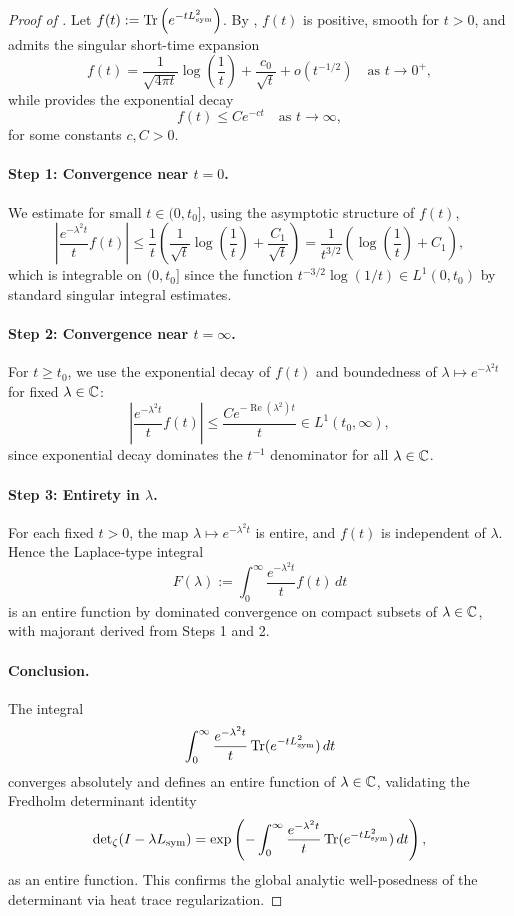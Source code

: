 \begin{proof}[Proof of ]
Let \( f(t) := \operatorname{Tr}\left(e^{-t L_{\mathrm{sym}}^2}\right) \). By , \( f(t) \) is positive, smooth for \( t > 0 \), and admits the singular short-time expansion
\[
f(t) = \frac{1}{\sqrt{4\pi t}} \log\left( \frac{1}{t} \right) + \frac{c_0}{\sqrt{t}} + o(t^{-1/2}) \quad \text{as } t \to 0^+,
\]
while  provides the exponential decay
\[
f(t) \leq C e^{-c t} \quad \text{as } t \to \infty,
\]
for some constants \( c, C > 0 \).

\paragraph{Step 1: Convergence near \( t = 0 \).}
We estimate for small \( t \in (0, t_0] \), using the asymptotic structure of \( f(t) \),
\[
\left| \frac{e^{-\lambda^2 t}}{t} f(t) \right|
\leq \frac{1}{t} \left( \frac{1}{\sqrt{t}} \log\left( \frac{1}{t} \right) + \frac{C_1}{\sqrt{t}} \right)
= \frac{1}{t^{3/2}} \left( \log\left( \frac{1}{t} \right) + C_1 \right),
\]
which is integrable on \( (0, t_0] \) since the function \( t^{-3/2} \log(1/t) \in L^1(0, t_0) \) by standard singular integral estimates.

\paragraph{Step 2: Convergence near \( t = \infty \).}
For \( t \geq t_0 \), we use the exponential decay of \( f(t) \) and boundedness of \( \lambda \mapsto e^{-\lambda^2 t} \) for fixed \( \lambda \in \mathbb{C} \):
\[
\left| \frac{e^{-\lambda^2 t}}{t} f(t) \right| \leq \frac{C e^{-\operatorname{Re}(\lambda^2) t}}{t} \in L^1(t_0, \infty),
\]
since exponential decay dominates the \( t^{-1} \) denominator for all \( \lambda \in \mathbb{C} \).

\paragraph{Step 3: Entirety in \( \lambda \).}
For each fixed \( t > 0 \), the map \( \lambda \mapsto e^{-\lambda^2 t} \) is entire, and \( f(t) \) is independent of \( \lambda \). Hence the Laplace-type integral
\[
F(\lambda) := \int_0^\infty \frac{e^{-\lambda^2 t}}{t} f(t)\, dt
\]
is an entire function by dominated convergence on compact subsets of \( \lambda \in \mathbb{C} \), with majorant derived from Steps 1 and 2.

\paragraph{Conclusion.}
The integral
\[
\int_0^\infty \frac{e^{-\lambda^2 t}}{t} \operatorname{Tr}(e^{-t L_{\mathrm{sym}}^2}) \, dt
\]
converges absolutely and defines an entire function of \( \lambda \in \mathbb{C} \), validating the Fredholm determinant identity
\[
\det\nolimits_\zeta(I - \lambda L_{\mathrm{sym}}) = \exp\left( -\int_0^\infty \frac{e^{-\lambda^2 t}}{t} \operatorname{Tr}(e^{-t L_{\mathrm{sym}}^2})\, dt \right),
\]
as an entire function. This confirms the global analytic well-posedness of the determinant via heat trace regularization.
\end{proof}
